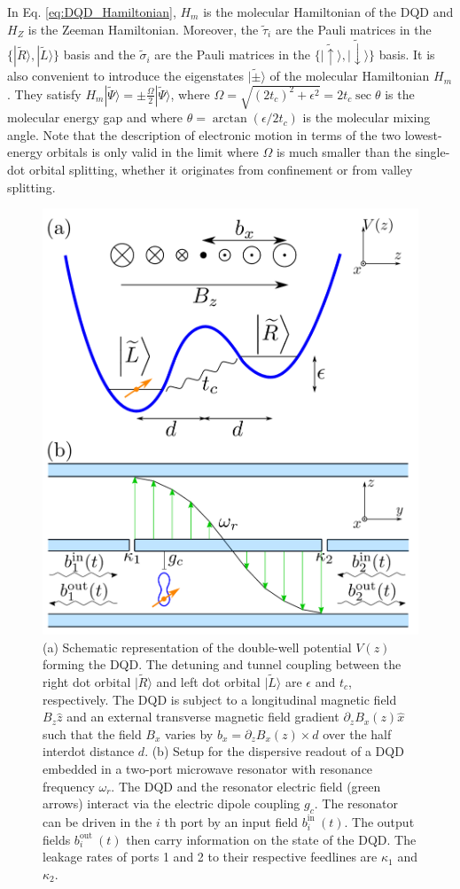 \documentclass[12pt]{report}
\begin{document}
In Eq. \ref{eq:DQD_Hamiltonian}, $H_m$ is the molecular Hamiltonian of the DQD and $H_Z$ is the Zeeman Hamiltonian. Moreover, the $\widetilde{\tau}_i$ are the Pauli matrices in the $\{|\widetilde{R}\rangle,|\widetilde{L}\rangle\}$ basis and the $\widetilde{\sigma}_i$ are the Pauli matrices in the $\{|\widetilde{\uparrow}\rangle,|\widetilde{\downarrow}\rangle\}$ basis. 
It is also convenient to introduce the eigenstates $|\widetilde{ \pm}\rangle$ of the molecular Hamiltonian $H_m$. They satisfy $H_m|\widetilde{\Psi}\rangle= \pm \frac{\Omega}{2}|\widetilde{\Psi}\rangle$, where $\Omega=\sqrt{\left(2 t_c\right)^2+\epsilon^2}=2 t_c \sec \theta$ is the molecular energy gap and where $\theta=\arctan \left(\epsilon / 2 t_c\right)$ is the molecular mixing angle. 
Note that the description of electronic motion in terms of the two lowest-energy orbitals is only valid in the limit where $\Omega$ is much smaller than the single-dot orbital splitting, whether it originates from confinement or from valley splitting.
\begin{figure}[H]
    \centering
    \includegraphics[width=0.5\linewidth]{DQD.png}
    \caption{
        (a) Schematic representation of the double-well potential $V(z)$ forming the DQD. The detuning and tunnel coupling between the right dot orbital $|\widetilde{R}\rangle$ and left dot orbital $|\widetilde{L}\rangle$ are $\epsilon$ and $t_c$, respectively. The DQD is subject to a longitudinal magnetic field $B_z \hat{z}$ and an external transverse magnetic field gradient $\partial_z B_x(z) \hat{x}$ such that the field $B_x$ varies by $b_x=\partial_z B_x(z) \times d$ over the half interdot distance $d$. (b) Setup for the dispersive readout of a DQD embedded in a two-port microwave resonator with resonance frequency $\omega_r$. The DQD and the resonator electric field (green arrows) interact via the electric dipole coupling $g_c$. The resonator can be driven in the $i$ th port by an input field $b_i^{\text {in }}(t)$. The output fields $b_i^{\text {out }}(t)$ then carry information on the state of the DQD. The leakage rates of ports 1 and 2 to their respective feedlines are $\kappa_1$ and $\kappa_2$.\cite{D_Anjou_2019}
    }
    \label{fig:DQD}
\end{figure}
\end{document}
